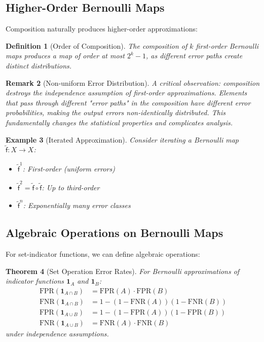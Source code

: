 \documentclass[11pt,final,hidelinks]{article}
\newtheorem{theorem}{Theorem}[section]
\newtheorem{definition}[theorem]{Definition}
\newtheorem{example}[theorem]{Example}
\newtheorem{remark}[theorem]{Remark}
\newcommand{\obs}[1]{\widetilde{#1}}  %
\newcommand{\AFun}[1]{\obs{\mathsf{#1}}}  %
\newcommand{\Set}[1]{#1}              %
\newcommand{\compose}{\circ}
\newcommand{\SetIndicator}[1]{\mathbf{1}_{#1}}
\begin{document}
\subsection{Higher-Order Bernoulli Maps}

Composition naturally produces higher-order approximations:

\begin{definition}[Order of Composition]
The composition of $k$ first-order Bernoulli maps produces a map of order at most $2^k - 1$, as different error paths create distinct distributions.
\end{definition}

\begin{remark}[Non-uniform Error Distribution]
A critical observation: composition destroys the independence assumption of first-order approximations. Elements that pass through different "error paths" in the composition have different error probabilities, making the output errors non-identically distributed. This fundamentally changes the statistical properties and complicates analysis.
\end{remark}

\begin{example}[Iterated Approximation]
Consider iterating a Bernoulli map $\AFun{f}: \Set{X} \to \Set{X}$:
\begin{itemize}
    \item $\AFun{f}^1$: First-order (uniform errors)
    \item $\AFun{f}^2 = \AFun{f} \compose \AFun{f}$: Up to third-order
    \item $\AFun{f}^n$: Exponentially many error classes
\end{itemize}
\end{example}

\subsection{Algebraic Operations on Bernoulli Maps}

For set-indicator functions, we can define algebraic operations:

\begin{theorem}[Set Operation Error Rates]
For Bernoulli approximations of indicator functions $\SetIndicator{A}$ and $\SetIndicator{B}$:
\begin{align}
\text{FPR}(\SetIndicator{A \cap B}) &= \text{FPR}(A) \cdot \text{FPR}(B) \\
\text{FNR}(\SetIndicator{A \cap B}) &= 1 - (1-\text{FNR}(A))(1-\text{FNR}(B)) \\
\text{FPR}(\SetIndicator{A \cup B}) &= 1 - (1-\text{FPR}(A))(1-\text{FPR}(B)) \\
\text{FNR}(\SetIndicator{A \cup B}) &= \text{FNR}(A) \cdot \text{FNR}(B)
\end{align}
under independence assumptions.
\end{theorem}
\end{document}
